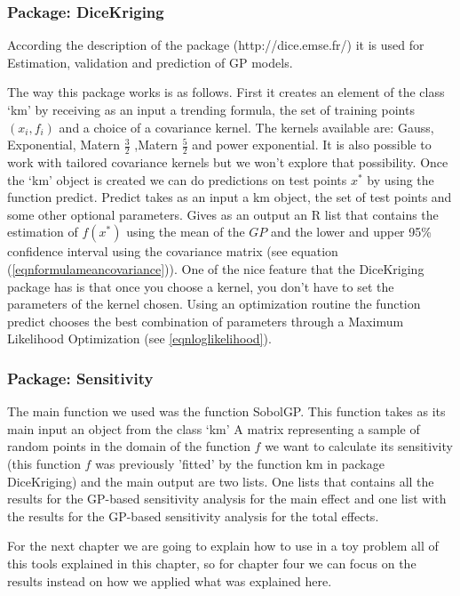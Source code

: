 \documentclass[12pt]{book}
\begin{document}
\subsubsection{Package: DiceKriging}
According the description of the package (http://dice.emse.fr/) it is used for Estimation, validation and 
prediction of GP models.

The way this package works is as follows. First it creates an element of the class `km' by receiving 
as an input a trending formula, the set of training points $(x_{i},f_{i})$ and a choice 
of a covariance kernel. The kernels available are: Gauss, Exponential, Matern $\frac{3}{2}$
,Matern $\frac{5}{2}$ and power exponential. It is also possible to work with tailored covariance
kernels but we won't explore that possibility. Once the `km' object is created we can do 
predictions on test points $x^{*}$ 
by using the function predict. Predict takes as an input a km object, the set of test points and 
some other optional parameters. Gives as an output an R list that contains the estimation of $f(x^{*})$
using the mean of the $GP$ and the lower and upper 95\% confidence interval using the 
covariance matrix (see equation (\ref{eqnformulameancovariance})).
One of the nice feature that the DiceKriging package has is that once you choose a kernel, you don't
have to set the parameters of the kernel chosen. Using an optimization routine the function
predict chooses the best combination
of parameters through a Maximum Likelihood Optimization \cite{dupuy2015dicedesign} (see \ref{eqnloglikelihood}).


\subsubsection{Package: Sensitivity}
The main function we used was the function SobolGP. This function takes as its main   input an object 
from the class `km' A matrix representing a sample of random points in the domain of the function $f$
we want to calculate its sensitivity (this function $f$ was previously 'fitted' by the function
km in package DiceKriging) and the main output are two lists. One lists that contains 
all the results for the GP-based sensitivity analysis for the main effect and one list with the 
results for the GP-based sensitivity analysis for the total effects.

 

For the next chapter we are going to explain how to use in a toy problem all of this tools explained in this 
chapter, so for chapter four we can focus on the results instead on how we applied what was explained here. 
\end{document}
